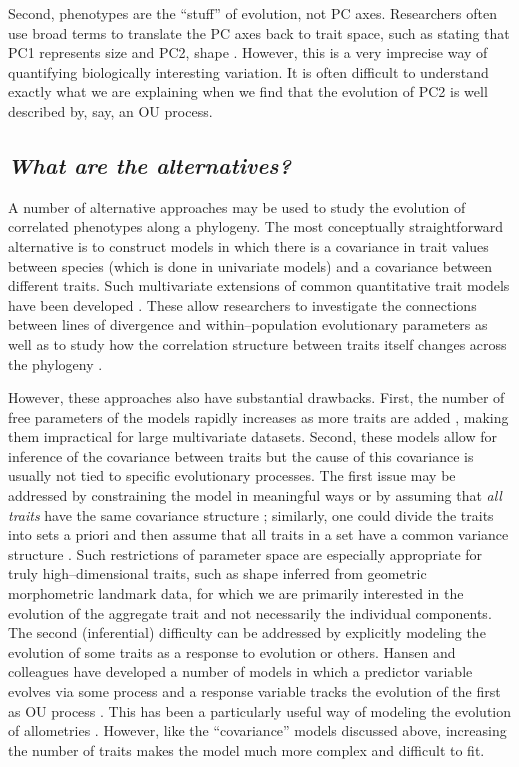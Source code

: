 \documentclass[a4paper,12pt]{article}
\begin{document}
Second, phenotypes are the ``stuff'' of evolution, not PC axes. Researchers often use broad terms to translate the PC axes back to trait space, such as stating that PC1 represents size and PC2, shape \citep[e.g.,][]{Harmon2010, Price2014}. However, this is a very imprecise way of quantifying biologically interesting variation. It is often difficult to understand exactly what we are explaining when we find that the evolution of PC2 is well described by, say, an OU process.

\subsection{\emph{What are the alternatives?}}

A number of alternative approaches may be used to study the evolution of correlated phenotypes along a phylogeny. The most conceptually straightforward alternative is to construct models in which there is a covariance in trait values between species (which is done in univariate models) and a covariance between different traits. Such multivariate extensions of common quantitative trait models have been developed \citep{RevellHarmon2008, Hohenlohe2008, RevellCollar2009, ButlerKing2009, motmot}. These allow researchers to investigate the connections between lines of divergence and within--population evolutionary parameters \citep{Hohenlohe2008} as well as to study how the correlation structure between traits itself changes across the phylogeny \citep{RevellCollar2009}. 

However, these approaches also have substantial drawbacks. First, the number of free parameters of the models rapidly increases as more traits are added \citep{RevellHarmon2008}, making them impractical for large multivariate datasets. Second, these models allow for inference of the covariance between traits but the cause of this covariance is usually not tied to specific evolutionary processes. The first issue may be addressed by constraining the model in meaningful ways \citep{ButlerKing2009} or by assuming that \emph{all traits} have the same covariance structure \citep{Adams2014, Adams2014b}; similarly, one could divide the traits into sets a priori and then assume that all traits in a set have a common variance structure \citep{Klingenberg2013}. Such restrictions of parameter space are especially appropriate for truly high--dimensional traits, such as shape inferred from geometric morphometric landmark data, for which we are primarily interested in the evolution of the aggregate trait and not necessarily the individual components. The second (inferential) difficulty can be addressed by explicitly modeling the evolution of some traits as a response to evolution or others. Hansen and colleagues have developed a number of models in which a predictor variable evolves via some process and a response variable tracks the evolution of the first as OU process \citep{Hansen2008, Labra2009, Hansen2012SysBio, Bartoszek2012}. This has been a particularly useful way of modeling the evolution of allometries \citep{Hansen2012SysBio, Voje2013, Voje2013b}. However, like the ``covariance''  models discussed above, increasing the number of traits makes the model much more complex and difficult to fit.
\end{document}
